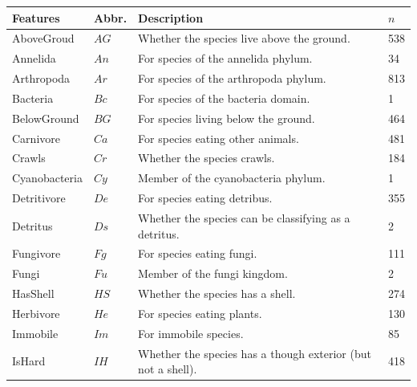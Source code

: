 \documentclass[letterpaper]{article}
\begin{document}
\begin{table}
  \centering
  \begin{tabular}{|llll|}
    \hline
    Features          & Abbr. & Description                                                       & $n$ \\
    \hline
    \hline
    AboveGroud        & $AG$   & Whether the species live above the ground.                       & 538 \\
    Annelida          & $An$   & For species of the annelida phylum.                              & 34 \\
    Arthropoda        & $Ar$   & For species of the arthropoda phylum.                            & 813 \\
    Bacteria          & $Bc$   & For species of the bacteria domain.                              & 1 \\
    BelowGround       & $BG$   & For species living below the ground.                             & 464 \\
    Carnivore         & $Ca$   & For species eating other animals.                                & 481 \\
    Crawls            & $Cr$   & Whether the species crawls.                                      & 184 \\
    Cyanobacteria     & $Cy$   & Member of the cyanobacteria phylum.                              & 1 \\
    Detritivore       & $De$   & For species eating detribus.                                     & 355 \\
    Detritus          & $Ds$   & Whether the species can be classifying as a detritus.            & 2 \\
    Fungivore          & $Fg$   & For species eating fungi.                                       & 111 \\
    Fungi             & $Fu$   & Member of the fungi kingdom.                                     & 2 \\
    HasShell          & $HS$   & Whether the species has a shell.                                 & 274 \\
    Herbivore         & $He$   & For species eating plants.                                       & 130 \\
    Immobile          & $Im$   & For immobile species.                                            & 85 \\
    IsHard            & $IH$   & Whether the species has a though exterior (but not a shell).     & 418 \\

\end{tabular}
\end{table}
\end{document}
